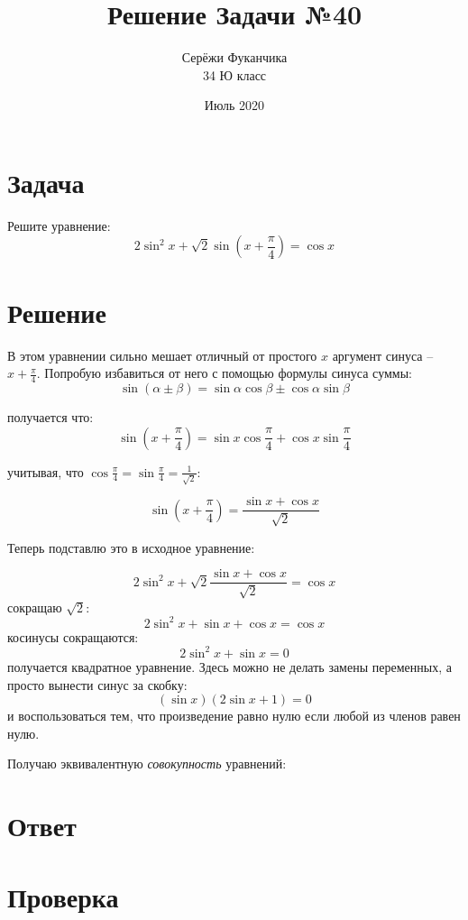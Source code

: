 \documentclass{article}
\title{Решение Задачи №40}
\author{Серёжи Фуканчика\\34 Ю класс}
\date{Июль 2020}
\begin{document}
\maketitle

\section{Задача}
Решите уравнение:
$$2\sin^2{x}+\sqrt{2}\sin\left(x+\frac{\pi}{4}\right)=\cos{x}$$

\section{Решение}
В этом уравнении сильно мешает отличный от простого $x$ аргумент синуса -- $x+\frac{\pi}{4}$. Попробую избавиться от него с помощью формулы синуса суммы:
$$\sin \left( \alpha \pm \beta \right) = \sin \alpha \cos \beta \pm \cos \alpha \sin \beta $$

получается что:
$$\sin{\left(x+\frac{\pi}{4}\right)}=\sin{x}\cos{\frac{\pi}{4}} + \cos{x}\sin{\frac{\pi}{4}}$$

учитывая, что $\cos{\frac{\pi}{4}}=\sin{\frac{\pi}{4}}=\frac{1}{\sqrt{2}}$:

$$\sin{\left(x+\frac{\pi}{4}\right)}=\frac{\sin{x} + \cos{x}}{\sqrt{2}}$$

Теперь подставлю это в исходное уравнение:

$$2\sin^2{x}+\sqrt{2}\frac{\sin{x} + \cos{x}}{\sqrt{2}}=\cos{x}$$
сокращаю $\sqrt{2}$:
$$2\sin^2{x}+\sin{x} + \cos{x} = \cos{x}$$
косинусы сокращаются:
$$2\sin^2{x}+\sin{x} = 0$$
получается квадратное уравнение. Здесь можно не делать замены переменных, а просто вынести синус за скобку:
$$(\sin{x})(2\sin{x} + 1) = 0$$
и воспользоваться тем, что произведение равно нулю если любой из членов равен нулю.

Получаю эквивалентную \textit{совокупность} уравнений:

\section{Ответ}

\section{Проверка}
\end{document}
